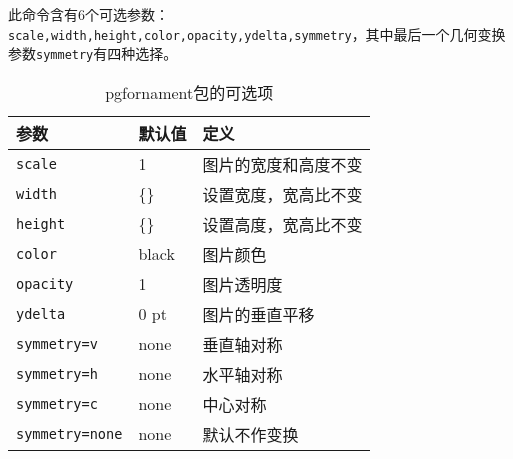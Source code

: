\documentclass{ctexbook}
\begin{document}
此命令含有6个可选参数：\texttt{scale,width,height,color,opacity,ydelta,symmetry}，其中最后一个几何变换参数\texttt{symmetry}有四种选择。

\begin{table}[h]\centering
{ \small   \begin{tabular}{lll}
      \toprule
参数 & 默认值  &  定义 \\
\midrule
\texttt{scale}          & 1          &图片的宽度和高度不变\\
\texttt{width}          & \{\}       & 设置宽度，宽高比不变  \\
\texttt{height}         & \{\}       & 设置高度，宽高比不变\\
\texttt{color}          & black      & 图片颜色 \\
\texttt{opacity}        & 1          & 图片透明度 \\
\texttt{ydelta}         & 0 pt       & 图片的垂直平移 \\
\texttt{symmetry=v}     & none       & 垂直轴对称\\
\texttt{symmetry=h}     & none       & 水平轴对称\\
\texttt{symmetry=c}     & none       & 中心对称\\
\texttt{symmetry=none}  & none       & 默认不作变换\\
\bottomrule
\end{tabular} }
\caption{pgfornament包的可选项}
  \label{tab:pgfornament-options}
\end{table}
\end{document}
